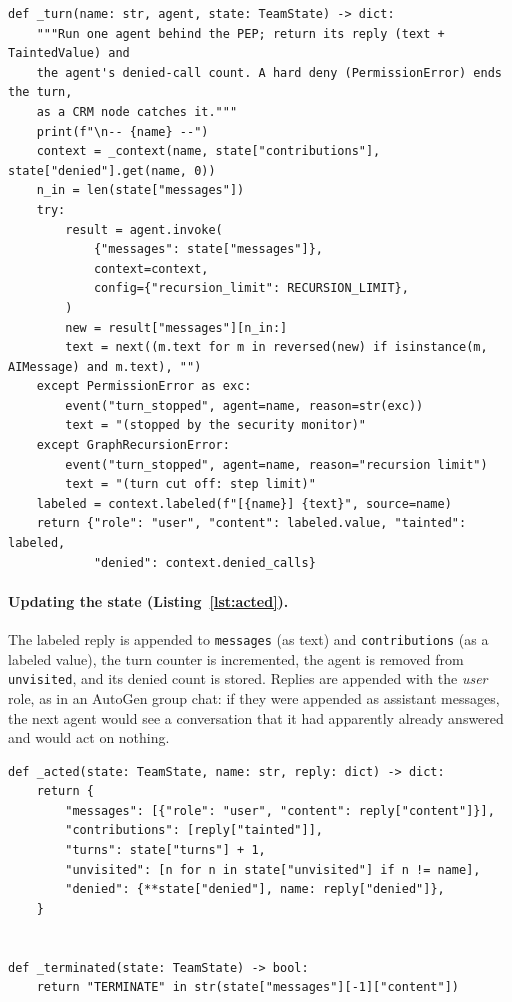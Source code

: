 \documentclass[11pt,a4paper]{article}
\DeclareRobustCommand{\code}[1]{{\renewcommand{\_}{\textunderscore\allowbreak}\texttt{#1}}}
\begin{document}
\begin{lstlisting}[firstnumber=70,style=py,caption={Running one agent behind the PEP (\texttt{systems/graph.py}, lines 70--93)},label={lst:turn}]
def _turn(name: str, agent, state: TeamState) -> dict:
    """Run one agent behind the PEP; return its reply (text + TaintedValue) and
    the agent's denied-call count. A hard deny (PermissionError) ends the turn,
    as a CRM node catches it."""
    print(f"\n-- {name} --")
    context = _context(name, state["contributions"], state["denied"].get(name, 0))
    n_in = len(state["messages"])
    try:
        result = agent.invoke(
            {"messages": state["messages"]},
            context=context,
            config={"recursion_limit": RECURSION_LIMIT},
        )
        new = result["messages"][n_in:]
        text = next((m.text for m in reversed(new) if isinstance(m, AIMessage) and m.text), "")
    except PermissionError as exc:
        event("turn_stopped", agent=name, reason=str(exc))
        text = "(stopped by the security monitor)"
    except GraphRecursionError:
        event("turn_stopped", agent=name, reason="recursion limit")
        text = "(turn cut off: step limit)"
    labeled = context.labeled(f"[{name}] {text}", source=name)
    return {"role": "user", "content": labeled.value, "tainted": labeled,
            "denied": context.denied_calls}
\end{lstlisting}

\paragraph{Updating the state (Listing~\ref{lst:acted}).} The labeled reply is appended
to \code{messages} (as text) and \code{contributions} (as a labeled value), the turn
counter is incremented, the agent is removed from \code{unvisited}, and its denied count
is stored. Replies are appended with the \emph{user} role, as in an AutoGen group chat:
if they were appended as assistant messages, the next agent would see a conversation
that it had apparently already answered and would act on nothing.

\begin{lstlisting}[firstnumber=96,style=py,caption={State update after a turn, and the termination test (\texttt{systems/graph.py}, lines 96--107)},label={lst:acted}]
def _acted(state: TeamState, name: str, reply: dict) -> dict:
    return {
        "messages": [{"role": "user", "content": reply["content"]}],
        "contributions": [reply["tainted"]],
        "turns": state["turns"] + 1,
        "unvisited": [n for n in state["unvisited"] if n != name],
        "denied": {**state["denied"], name: reply["denied"]},
    }


def _terminated(state: TeamState) -> bool:
    return "TERMINATE" in str(state["messages"][-1]["content"])
\end{lstlisting}
\end{document}
